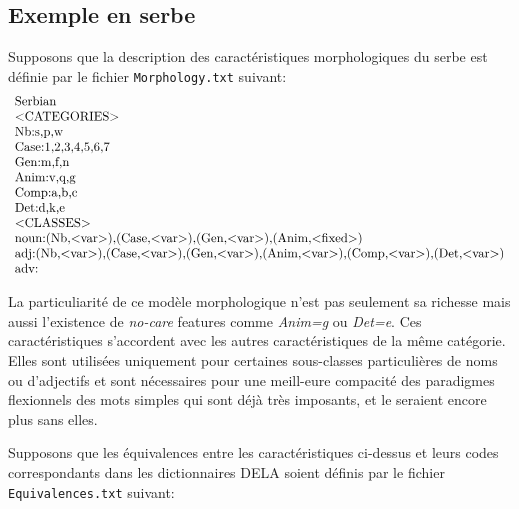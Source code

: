 \subsection{Exemple en serbe}
Supposons que la description des caractéristiques morphologiques du serbe est définie par le fichier
\verb+Morphology.txt+ suivant:
\[
\begin{array}[l]{l}
$Serbian$\\
$<CATEGORIES>$\\
$Nb:s,p,w$ \\
$Case:1,2,3,4,5,6,7$\\
$Gen:m,f,n$\\
$Anim:v,q,g$\\
$Comp:a,b,c$\\
$Det:d,k,e$\\
$<CLASSES>$\\
$noun:(Nb,<var>),(Case,<var>),(Gen,<var>),(Anim,<fixed>)$\\
$adj:(Nb,<var>),(Case,<var>),(Gen,<var>),(Anim,<var>),(Comp,<var>),(Det,<var>)$\\
$adv:$
\end{array}
\]

\bigskip
\noindent La particuliarité de ce modèle morphologique n'est pas seulement sa richesse mais aussi
l'existence de \emph{no-care} features comme \emph{Anim=g} ou \emph{Det=e}. Ces caractéristiques 
s'accordent avec les autres caractéristiques de la même catégorie. Elles sont utilisées uniquement
pour certaines sous-classes particulières de noms ou d'adjectifs et sont nécessaires pour une
meill-eure compacité des paradigmes flexionnels des mots simples qui sont déjà très imposants, et le
seraient encore plus sans elles.

\bigskip
\noindent Supposons que les équivalences entre les caractéristiques ci-dessus et leurs codes
correspondants dans les dictionnaires DELA soient définis par le fichier \verb+Equivalences.txt+ suivant:

